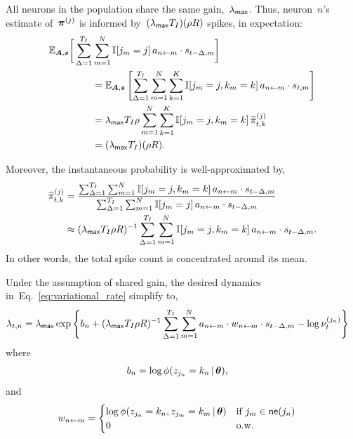 \begin{assumption}
  All neurons in the population share the same gain,~$\lambda_{\mathsf{max}}$. 
  Thus, neuron~$n$'s estimate of~$\boldsymbol{\pi}^{(j)}$ is 
  informed by~$(\lambda_{\mathsf{max}} T_I)(\rho R)$ spikes, in expectation:
  \begin{align}
    \mathbb{E}_{\boldsymbol{A},\boldsymbol{s}} \bigg[ \sum_{\Delta = 1}^{T_I} & \sum_{m=1}^N \mathbb{I}[j_m=j] \, a_{n \leftarrow m} \cdot s_{t-\Delta,m} \bigg] \\
    &= \mathbb{E}_{\boldsymbol{A},\boldsymbol{s}} \left[ \sum_{\Delta = 1}^{T_I} \sum_{m=1}^N \sum_{k=1}^K \mathbb{I}[j_m=j, k_m=k] \, a_{n \leftarrow m} \cdot s_{t,m} \right] \\
    &= \lambda_{\mathsf{max}} T_I \rho \sum_{m=1}^N \sum_{k=1}^K \mathbb{I}[j_m=j, k_m=k] \, \widehat{\pi}_{t,k}^{(j)} \\
    &= (\lambda_{\mathsf{max}} T_I) (\rho R).
  \end{align}

  Moreover, the instantaneous probability is well-approximated by,
  \begin{align}
      \widehat{\pi}_{t,k}^{(j)} &=
  \frac{\sum_{\Delta=1}^{T_I} \sum_{m=1}^N \mathbb{I}[j_m=j, k_m=k] \, a_{n \leftarrow m} \cdot s_{t-\Delta, m}}
       {\sum_{\Delta=1}^{T_I} \sum_{m=1}^N \mathbb{I}[j_m=j] \, a_{n \leftarrow m} \cdot s_{t-\Delta, m}} \\
       &\approx (\lambda_{\mathsf{max}} T_I \rho R)^{-1} \sum_{\Delta=1}^{T_I} \sum_{m=1}^N \mathbb{I}[j_m=j, k_m=k] \, a_{n \leftarrow m} \cdot s_{t-\Delta, m}.
  \end{align}
  In other words, the total spike count is concentrated around its mean.
\end{assumption}

Under the assumption of shared gain, the
desired dynamics in~Eq.~\ref{eq:variational_rate}
simplify to,
\begin{align}
  \label{eq:mf_log_probs}
  \lambda_{t,n} &= \lambda_{\mathsf{max}}
  \exp \left \{b_n + (\lambda_{\mathsf{max}} T_I \rho R)^{-1} \sum_{\Delta=1}^{T_I} \sum_{m=1}^N a_{n \leftarrow m} \cdot w_{n \leftarrow m} \cdot s_{t-\Delta,m}
  - \log \nu_t^{(j_n)} \right \}
\end{align}
where
\begin{align}
  b_n &= \log \phi(z_{j_n} = k_n \,|\, \boldsymbol{\theta}),
\end{align}
and
\begin{align}
  w_{n \leftarrow m} &=
  \begin{cases}
    \log \phi(z_{j_n}=k_n, z_{j_m}=k_m \,|\, \boldsymbol{\theta}) & \text{if }j_m
    \in \mathsf{ne}(j_n) \\
    0 & \text{o.w.}
  \end{cases}
\end{align}

